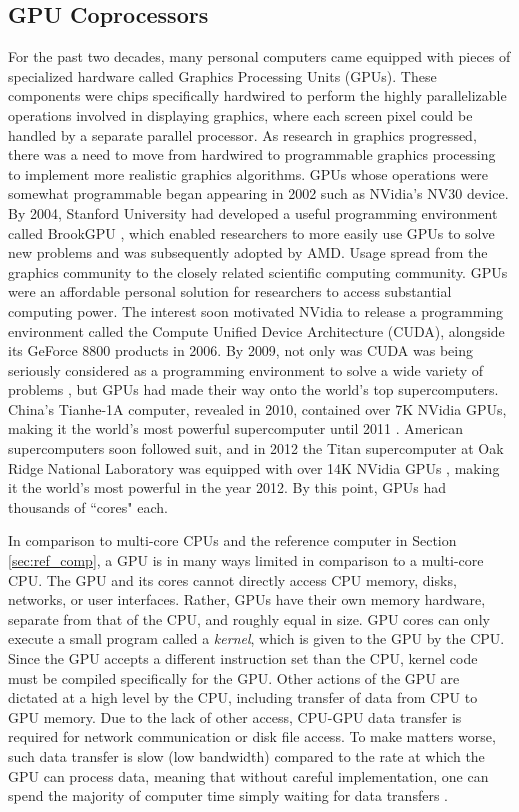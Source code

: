 \subsection{GPU Coprocessors}
\label{sec:def_gpu}

For the past two decades, many personal computers came
equipped with pieces of specialized hardware called
Graphics Processing Units (GPUs).
These components were chips specifically hardwired to
perform the highly parallelizable operations involved
in displaying graphics, where each screen pixel could be handled
by a separate parallel processor.
As research in graphics progressed, there was a need to
move from hardwired to programmable graphics processing
to implement more realistic graphics algorithms.
GPUs whose operations were somewhat programmable began appearing
in 2002 such as NVidia's NV30 device.
By 2004, Stanford University had developed a useful programming
environment called BrookGPU \cite{buck2004brook}, which
enabled researchers to more easily use GPUs to solve new problems
and was subsequently adopted by AMD.
Usage spread from the graphics community to the closely
related scientific computing community.
GPUs were an affordable personal solution for researchers
to access substantial computing power.
The interest soon motivated NVidia to release a programming
environment called the Compute Unified Device Architecture (CUDA),
alongside its GeForce 8800 products in 2006.
By 2009, not only was CUDA was being seriously considered as a programming
environment to solve a wide variety of problems \cite{hwu2009compute},
but GPUs had made their way onto the world's top supercomputers.
China's Tianhe-1A computer, revealed in 2010,
contained over 7K NVidia GPUs, making it the world's
most powerful supercomputer until 2011 \cite{yang2011tianhe}.
American supercomputers soon followed suit, and in 2012
the Titan supercomputer at Oak Ridge National Laboratory
was equipped with over 14K NVidia GPUs \cite{bland2012titan},
making it the world's most powerful in the year 2012.
By this point, GPUs had thousands of ``cores" each.

In comparison to multi-core CPUs and the reference computer
in Section \ref{sec:ref_comp},
a GPU is in many ways limited in comparison to a multi-core CPU.
The GPU and its cores cannot directly access CPU memory,
disks, networks, or user interfaces.
Rather, GPUs have their own memory hardware, separate from that of the CPU,
and roughly equal in size.
GPU cores can only execute a small program called a \emph{kernel},
which is given to the GPU by the CPU.
Since the GPU accepts a different instruction set than the CPU,
kernel code must be compiled specifically for the GPU.
Other actions of the GPU are dictated at a high level
by the CPU, including transfer of data from CPU to GPU memory.
Due to the lack of other access, CPU-GPU data transfer is required
for network communication or disk file access.
To make matters worse, such data transfer is slow (low bandwidth)
compared to the rate at which the GPU can process data,
meaning that without careful implementation, one can spend
the majority of computer time simply waiting for data transfers
\cite{gregg2011data}.

